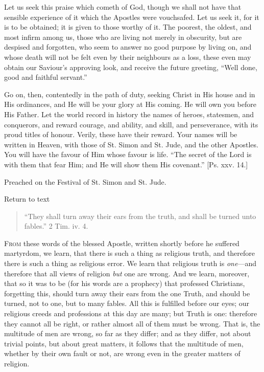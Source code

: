 Let us seek this praise which cometh of God, though we shall not
have that sensible experience of it which the Apostles were
vouchsafed. Let us seek it, for it is to be obtained; it is given to
those worthy of it. The poorest, the oldest, and most infirm among us,
those who are living not merely in obscurity, but are despised and
forgotten, who seem to answer no good purpose by living on, and whose
death will not be felt even by their neighbours as a loss, these even
may obtain our Saviour's approving look, and receive the future
greeting, ``Well done, good and faithful servant.''

Go on, then, contentedly in the path of duty, seeking Christ in His
house and in His ordinances, and He will be your glory at His coming.
He will own you before His Father. Let the world record in history the
names of heroes, statesmen, and conquerors, and reward courage, and
ability, and skill, and perseverance, with its proud titles of honour.
Verily, these have their reward. Your names will be written in Heaven,
with those of St. Simon and St. Jude, and the other Apostles. You will
have the favour of Him whose favour is life. ``The secret of the
Lord is with them that fear Him; and He will show them His
covenant.'' [Ps. xxv. 14.]


Preached on the Festival of St. Simon and St. Jude.

Return to text


\begin{quote}

``They shall turn away their ears from the truth, and shall
be turned unto fables.'' 2 Tim. iv. 4.

\end{quote}

F\textsc{rom} these words of the blessed Apostle, written shortly before he
suffered martyrdom, we learn, that there is such a thing as religious
truth, and therefore there is such a thing as religious error. We
learn that religious truth is \emph{one}—and therefore that all
views of religion \emph{but} one are wrong. And we learn, moreover,
that so it was to be (for his words are a prophecy) that professed
Christians, forgetting this, should turn away their ears from the one
Truth, and should be turned, not to one, but to many fables. All this
is fulfilled before our eyes; our religious creeds and professions at
this day are many; but Truth is one: therefore they cannot all be
right, or rather almost all of them must be wrong. That is, the
multitude of men are wrong, so far as they differ; and as they differ,
not about trivial points, but about great matters, it follows that the
multitude of men, whether by their own fault or not, are wrong even in
the greater matters of religion.

